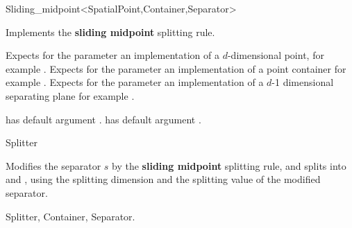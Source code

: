 

\begin{ccRefFunctionObjectClass}{Sliding_midpoint<SpatialPoint,Container,Separator>}  %


\ccDefinition
Implements the {\bf sliding midpoint} splitting rule.

\ccParameters

Expects for the parameter  an implementation of a $d$-dimensional point,
for example . Expects for the parameter  an implementation
of a point container for example .
Expects for the parameter  an implementation of a $d$-1 dimensional 
separating plane for example .

 has default argument .
 has default argument . 



\ccIsModel

Splitter

\ccTypes




\ccOperations

{Modifies the separator $s$ by the {\bf sliding midpoint} splitting rule, 
and splits  into  and ,
using the splitting dimension and the splitting value of the modified separator.
}

\ccSeeAlso

Splitter, Container, Separator.
\end{ccRefFunctionObjectClass}


